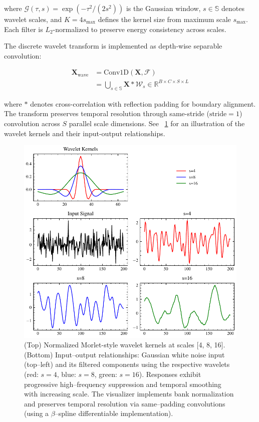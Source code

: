 \documentclass[10pt, conference]{IEEEtran}
\begin{document}
where $\mathcal{G}(\tau,s) = \exp(-\tau^2/(2s^2))$ is the Gaussian window, $s \in \mathbb{S}$ denotes wavelet scales, and $K=4s_{\text{max}}$ defines the kernel size from maximum scale $s_{\text{max}}$. Each filter is $L_2$-normalized to preserve energy consistency across scales.

The discrete wavelet transform is implemented as depth-wise separable convolution:

\begin{equation}
    \begin{aligned}
        \mathbf{X}_{\text{wave}} & = \text{Conv1D}(\mathbf{X}, \mathcal{F})                                                                 \\
                                 & = \bigcup_{s \in \mathbb{S}} \mathbf{X} \ast \mathcal{W}_s \in \mathbb{R}^{B \times C \times S \times L}
    \end{aligned}
\end{equation}

where $\ast$ denotes cross-correlation with reflection padding for boundary alignment. The transform preserves temporal resolution through same-stride ($\text{stride}=1$) convolution across $S$ parallel scale dimensions. See \figurename~\ref{fig:wavelet-transform} for an illustration of the wavelet kernels and their input-output relationships.


\begin{figure}[tb]
    \centering
    \includegraphics[width=\linewidth]{wavelet-transform.pdf}
    \caption{(Top) Normalized Morlet-style wavelet kernels at scales [4, 8, 16]. (Bottom) Input–output relationships: Gaussian white noise input (top–left) and its filtered components using the respective wavelets (red: $s=4$, blue: $s=8$, green: $s=16$). Responses exhibit progressive high–frequency suppression and temporal smoothing with increasing scale. The visualizer implements bank normalization and preserves temporal resolution via same–padding convolutions (using a $\beta$–spline differentiable implementation).}

    \label{fig:wavelet-transform}
\end{figure}
\end{document}
